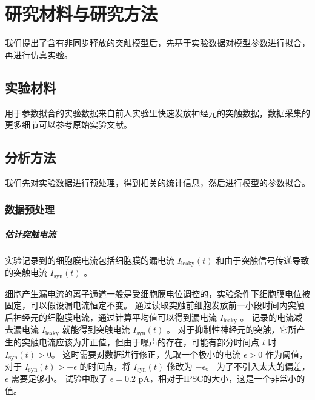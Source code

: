 \chapter{研究材料与研究方法}
\label{chapter:methods}

我们提出了含有非同步释放的突触模型后，先基于实验数据对模型参数进行拟合，再进行仿真实验。

\section{实验材料}
\label{section:methods:materials}

用于参数拟合的实验数据来自前人实验里快速发放神经元的突触数据，数据采集的更多细节可以参考原始实验文献\cite{Jiang2012}。

\section{分析方法}
\label{section:methods:methods}

我们先对实验数据进行预处理，得到相关的统计信息，然后进行模型的参数拟合。

\subsection{数据预处理}
\label{section:methods:data-preprocessing}

\paragraph{估计突触电流}
实验记录到的细胞膜电流包括细胞膜的漏电流 $I_\text{leaky}(t)$ 和由于突触信号传递导致的突触电流 $I_\text{syn}(t)$ 。

细胞产生漏电流的离子通道一般是受细胞膜电位调控的，实验条件下细胞膜电位被固定，可以假设漏电流恒定不变。
通过读取突触前细胞发放前一小段时间内突触后神经元的细胞膜电流，通过计算平均值可以得到漏电流 $I_\text{leaky}$ 。
记录的电流减去漏电流 $I_\text{leaky}$ 就能得到突触电流 $I_\text{syn}(t)$ 。
对于抑制性神经元的突触，它所产生的突触电流应该为非正值，但由于噪声的存在，可能有部分时间点 $t$ 时 $I_\text{syn}(t) > 0$。
这时需要对数据进行修正，先取一个极小的电流 $\epsilon > 0$ 作为阈值，对于 $I_\text{syn}(t) > -\epsilon$ 的时间点，将 $I_\text{syn}(t)$ 修改为 $-\epsilon$。
为了不引入太大的偏差， $\epsilon$ 需要足够小。
试验中取了 $\epsilon = 0.2$ pA，相对于IPSC的大小，这是一个非常小的值。

